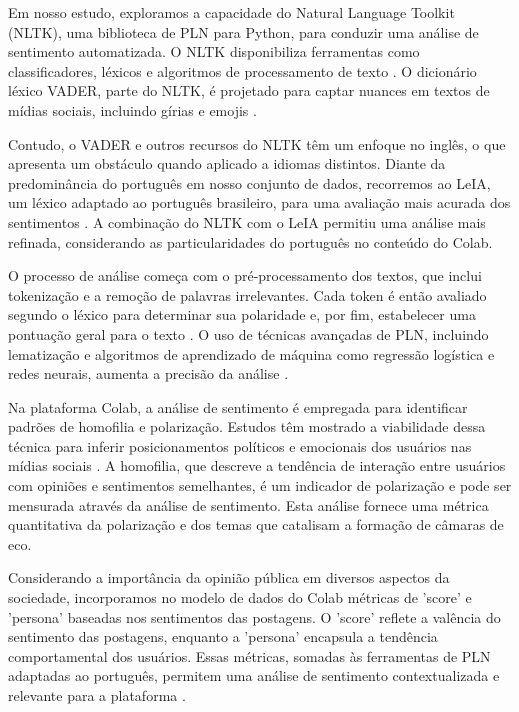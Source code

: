 Em nosso estudo, exploramos a capacidade do Natural Language Toolkit (NLTK), uma biblioteca de PLN para Python, para conduzir uma análise de sentimento automatizada. O NLTK disponibiliza ferramentas como classificadores, léxicos e algoritmos de processamento de texto \cite{2009_Bird_BOOK}. O dicionário léxico VADER, parte do NLTK, é projetado para captar nuances em textos de mídias sociais, incluindo gírias e emojis \cite{2014_Hutto}.

Contudo, o VADER e outros recursos do NLTK têm um enfoque no inglês, o que apresenta um obstáculo quando aplicado a idiomas distintos. Diante da predominância do português em nosso conjunto de dados, recorremos ao LeIA, um léxico adaptado ao português brasileiro, para uma avaliação mais acurada dos sentimentos \cite{2018_Almeida_PAGE}. A combinação do NLTK com o LeIA permitiu uma análise mais refinada, considerando as particularidades do português no conteúdo do Colab.

O processo de análise começa com o pré-processamento dos textos, que inclui tokenização e a remoção de palavras irrelevantes. Cada token é então avaliado segundo o léxico para determinar sua polaridade e, por fim, estabelecer uma pontuação geral para o texto \cite{2013_Haddi}. O uso de técnicas avançadas de PLN, incluindo lematização e algoritmos de aprendizado de máquina como regressão logística e redes neurais, aumenta a precisão da análise \cite{2014_Kim}.

Na plataforma Colab, a análise de sentimento é empregada para identificar padrões de homofilia e polarização. Estudos têm mostrado a viabilidade dessa técnica para inferir posicionamentos políticos e emocionais dos usuários nas mídias sociais \cite{2014_Hutto}. A homofilia, que descreve a tendência de interação entre usuários com opiniões e sentimentos semelhantes, é um indicador de polarização e pode ser mensurada através da análise de sentimento. Esta análise fornece uma métrica quantitativa da polarização e dos temas que catalisam a formação de câmaras de eco.

Considerando a importância da opinião pública em diversos aspectos da sociedade, incorporamos no modelo de dados do Colab métricas de 'score' e 'persona' baseadas nos sentimentos das postagens. O 'score' reflete a valência do sentimento das postagens, enquanto a 'persona' encapsula a tendência comportamental dos usuários. Essas métricas, somadas às ferramentas de PLN adaptadas ao português, permitem uma análise de sentimento contextualizada e relevante para a plataforma \cite{2012_Souza_IP}.

